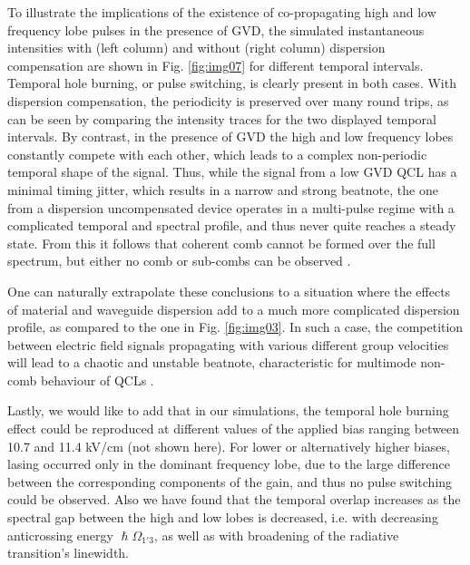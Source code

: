 \documentclass[10pt]{article}
\begin{document}
	To illustrate the implications of the existence of co-propagating high
	and low frequency lobe pulses in the presence of GVD, the simulated
	instantaneous intensities with (left column) and without (right column)
	dispersion compensation are shown in Fig. \ref{fig:img07} for different
	temporal intervals. Temporal hole burning, or pulse switching, is clearly
	present in both cases. With dispersion compensation, the periodicity is
	preserved over many round trips, as can be seen by comparing the intensity
	traces for the two displayed temporal intervals. By contrast, in the presence
	of GVD the high and low frequency lobes constantly compete with each other,
	which leads to a complex non-periodic temporal shape of the signal. Thus, while
	the signal from a low GVD QCL has a minimal timing jitter, which results in a
	narrow and strong beatnote, the one from a dispersion uncompensated device
	operates in a multi-pulse regime with a complicated temporal and spectral
	profile, and thus never quite reaches a steady state. From this it follows that coherent 
	comb cannot be formed over the full spectrum, but either no comb or sub-combs can be observed \cite{wienold2014evidence,rosch2015octave}. 
	
	One can naturally extrapolate these conclusions to a situation where the
	effects of material and waveguide dispersion add to a much more complicated
	dispersion profile, as compared to the one in Fig. \ref{fig:img03}. In such a
	case, the competition between electric field signals propagating with various
	different group velocities will lead to a chaotic and unstable beatnote,
	characteristic for multimode non-comb behaviour of QCLs \cite{wienold2014evidence,rosch2015octave}.
	
	Lastly, we would like to add that in our simulations, the temporal hole burning effect could be 
	reproduced at different values of the applied bias ranging between 10.7 and 11.4 kV/cm (not shown here).
	For lower or alternatively higher biases, lasing occurred only in the dominant frequency lobe, 
	due to the large difference between the corresponding components of the gain, and thus no pulse switching could be observed.
	Also we have found that the temporal overlap increases as the spectral gap between the high and low lobes is decreased, i.e. with 
	decreasing anticrossing energy $\hslash \Omega_{1'3}$, as well as with broadening of the radiative transition's linewidth. 
	
\end{document}
